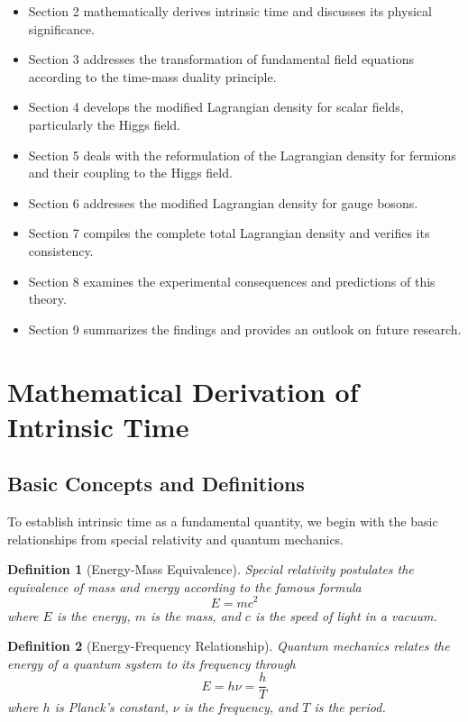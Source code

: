 \documentclass[a4paper,12pt]{article}
\newtheorem{definition}{Definition}[section]
\begin{document}
	\begin{itemize}
		\item Section 2 mathematically derives intrinsic time and discusses its physical significance.
		\item Section 3 addresses the transformation of fundamental field equations according to the time-mass duality principle.
		\item Section 4 develops the modified Lagrangian density for scalar fields, particularly the Higgs field.
		\item Section 5 deals with the reformulation of the Lagrangian density for fermions and their coupling to the Higgs field.
		\item Section 6 addresses the modified Lagrangian density for gauge bosons.
		\item Section 7 compiles the complete total Lagrangian density and verifies its consistency.
		\item Section 8 examines the experimental consequences and predictions of this theory.
		\item Section 9 summarizes the findings and provides an outlook on future research.
	\end{itemize}
	
	\section{Mathematical Derivation of Intrinsic Time}
	
	\subsection{Basic Concepts and Definitions}
	
	To establish intrinsic time as a fundamental quantity, we begin with the basic relationships from special relativity and quantum mechanics.
	
	\begin{definition}[Energy-Mass Equivalence]
		Special relativity postulates the equivalence of mass and energy according to the famous formula
		\begin{equation}
			E = mc^2
		\end{equation}
		where \( E \) is the energy, \( m \) is the mass, and \( c \) is the speed of light in a vacuum.
	\end{definition}
	
	\begin{definition}[Energy-Frequency Relationship]
		Quantum mechanics relates the energy of a quantum system to its frequency through
		\begin{equation}
			E = h\nu = \frac{h}{T}
		\end{equation}
		where \( h \) is Planck’s constant, \( \nu \) is the frequency, and \( T \) is the period.
	\end{definition}
	
\end{document}
